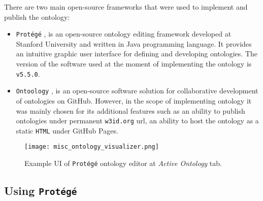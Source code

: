 There are two main open-source frameworks that were used to implement and publish the \lpas{} ontology:
\begin{itemize}
	\item \texttt{Protégé} \cite{noy2003protege}, is an open-source ontology editing framework developed at Stanford University and written in Java programming language. It provides an intuitive graphic user interface for defining and developing ontologies. The version of the software used at the moment of implementing the ontology is \texttt{v5.5.0}.
	\item \texttt{Ontoology} \cite{alobaid2015ontoology}, is an open-source software solution for collaborative development of ontologies on GitHub. However, in the scope of implementing \lpas{} ontology it was mainly chosen for its additional features such as an ability to publish ontologies under permanent \texttt{w3id.org} url, an ability to host the ontology as a static \texttt{HTML} under GitHub Pages. 
\end{itemize}

\begin{figure}[h]
\centering
\texttt{[image: misc\_ontology\_visualizer.png]}
\caption{Example UI of \texttt{Protégé} ontology editor at \textit{Active Ontology} tab.}
\label{fig:misc_ontology_visualizer}
\end{figure}

\subsection{Using \texttt{Protégé}}

